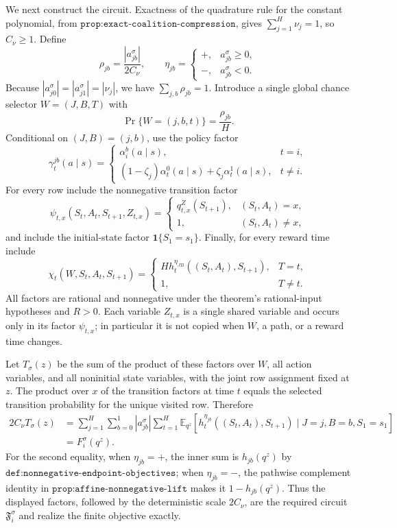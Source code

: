 We next construct the circuit.  Exactness of the quadrature rule for the constant polynomial, from \(\texttt{prop:exact-coalition-compression}\), gives \(\sum_{j=1}^H\nu_j=1\), so \(C_\nu\ge1\).  Define
\[
 \rho_{jb}=\frac{|a_{jb}^\sigma|}{2C_\nu},
 \qquad
 \eta_{jb}=\begin{cases}
 +,&a_{jb}^\sigma\ge0,\\
 -,&a_{jb}^\sigma<0.
 \end{cases}
\]
Because \(|a_{j0}^\sigma|=|a_{j1}^\sigma|=|\nu_j|\), we have \(\sum_{j,b}\rho_{jb}=1\).  Introduce a single global chance selector \(W=(J,B,T)\) with
\[
 \Pr\{W=(j,b,t)\}=\frac{\rho_{jb}}{H}.
\]
Conditional on \((J,B)=(j,b)\), use the policy factor
\[
 \gamma^{jb}_t(a\mid s)=
 \begin{cases}
 \alpha_i^b(a\mid s),&t=i,\\
 (1-\zeta_j)\alpha_t^0(a\mid s)+\zeta_j\alpha_t^1(a\mid s),&t\ne i.
 \end{cases}
\]
For every row include the nonnegative transition factor
\[
 \psi_{t,x}(S_t,A_t,S_{t+1},Z_{t,x})=
 \begin{cases}
 q^{Z}_{t,x}(S_{t+1}),&(S_t,A_t)=x,\\
 1,&(S_t,A_t)\ne x,
 \end{cases}
\]
and include the initial-state factor \(\mathbf 1\{S_1=s_1\}\).  Finally, for every reward time include
\[
 \chi_t(W,S_t,A_t,S_{t+1})=
 \begin{cases}
 Hh_t^{\eta_{JB}}((S_t,A_t),S_{t+1}),&T=t,\\
 1,&T\ne t.
 \end{cases}
\]
All factors are rational and nonnegative under the theorem's rational-input hypotheses and \(R>0\).  Each variable \(Z_{t,x}\) is a single shared variable and occurs only in its factor \(\psi_{t,x}\); in particular it is not copied when \(W\), a path, or a reward time changes.

Let \(T_\sigma(z)\) be the sum of the product of these factors over \(W\), all action variables, and all noninitial state variables, with the joint row assignment fixed at \(z\).  The product over \(x\) of the transition factors at time \(t\) equals the selected transition probability for the unique visited row.  Therefore
\[
 \begin{aligned}
 2C_\nu T_\sigma(z)
 &=\sum_{j=1}^H\sum_{b=0}^1 |a_{jb}^\sigma|
   \sum_{t=1}^H
   \mathbb E_{q^z}\!\left[
    h_t^{\eta_{jb}}((S_t,A_t),S_{t+1})
    \mid J=j,B=b,S_1=s_1
   \right]\\
 &=F_i^\sigma(q^z).
 \end{aligned}
\]
For the second equality, when \(\eta_{jb}=+\), the inner sum is \(h_{jb}(q^z)\) by \(\texttt{def:nonnegative-endpoint-objectives}\); when \(\eta_{jb}=-\), the pathwise complement identity in \(\texttt{prop:affine-nonnegative-lift}\) makes it \(1-h_{jb}(q^z)\).  Thus the displayed factors, followed by the deterministic scale \(2C_\nu\), are the required circuit \(\mathfrak F_i^\sigma\) and realize the finite objective exactly.

